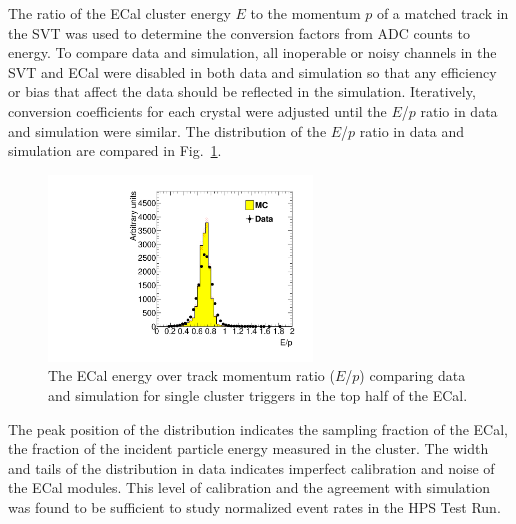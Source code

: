 \documentclass[final,3p,times,twocolumn]{elsarticle}
\begin{document}
The ratio of the ECal cluster energy $E$ to the momentum $p$ of a matched track in the SVT was used 
to determine the conversion factors from ADC counts to energy. To compare data and simulation, all 
inoperable or noisy channels in the SVT and ECal were disabled in both data and simulation so that 
any efficiency or bias that affect the data should be reflected in the simulation. 
Iteratively, conversion coefficients for each crystal were adjusted until the $E$/$p$ ratio in data and 
simulation were similar. The distribution of the $E$/$p$ ratio in data and simulation are compared in 
Fig.~\ref{fig:gains}. 
{\small
\begin{figure}[]
\begin{center}
	\includegraphics[width=7cm]{figures/h_ep_data_0_h_ep_MC_0_dataMC_1351-v6-v6gains_2-trig-top-cl600reg0.pdf}
	\caption{The ECal energy over track momentum ratio ($E$/$p$) comparing data and simulation 
	for single cluster triggers in the top half of the ECal.} 
	\label{fig:gains}
\end{center}
\end{figure}
}
The peak position of the distribution indicates the sampling fraction of the ECal, the fraction of the 
incident particle energy measured in the cluster. The width and tails of the distribution 
in data indicates imperfect calibration and noise of the ECal modules. This level of calibration and the 
agreement with simulation was found to be sufficient to study normalized event rates in the 
HPS Test Run.
\end{document}
